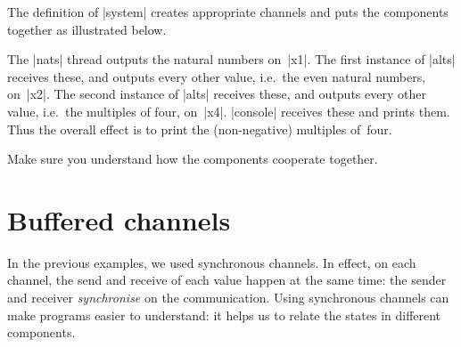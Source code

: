 The definition of |system| creates appropriate channels and puts the
components together as illustrated below.
%
\begin{center}
\end{center}
%
The |nats| thread outputs the natural numbers on~|x1|.  The first instance of
|alts| receives these, and outputs every other value, i.e.~the even natural
numbers, on~|x2|.  The second instance of |alts| receives these, and outputs
every other value, i.e.~the multiples of four, on~|x4|.  |console| receives
these and prints them.  Thus the overall effect is to print the (non-negative)
multiples of~four.

\begin{instruction}
Make sure you understand how the components cooperate together.
\end{instruction}


\section{Buffered channels}

In the previous examples, we used synchronous channels.  In effect, on each
channel, the send and receive of each value happen at the same time: the
sender and receiver \emph{synchronise} on the communication.
%
Using synchronous channels can make programs easier to understand: it helps us
to relate the states in different components.

